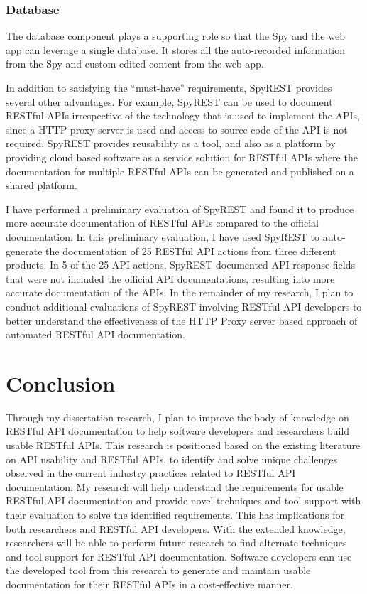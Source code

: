 \documentclass[11pt,oneside]{book}
\begin{document}
\subsection{Database}

The database component plays a supporting role so that the Spy and the web app can leverage a single database. It stores all the auto-recorded information from the Spy and custom edited content from the web app.

In addition to satisfying the “must-have” requirements, SpyREST provides several other advantages. For example, SpyREST can be used to document RESTful APIs irrespective of the technology that is used to implement the APIs, since a HTTP proxy server is used and access to source code of the API is not required. SpyREST provides reusability as a tool, and also as a platform by providing cloud based software as a service solution for RESTful APIs where the documentation for multiple RESTful APIs can be generated and published on a shared platform.

I have performed a preliminary evaluation of SpyREST and found it to produce more accurate documentation of RESTful APIs compared to the official documentation. In this preliminary evaluation, I have used SpyREST to auto-generate the documentation of 25 RESTful API actions from three different products. In 5 of the 25 API actions, SpyREST documented API response fields that were not included the official API documentations, resulting into more accurate documentation of the APIs. In the remainder of my research, I plan to conduct additional evaluations of SpyREST involving RESTful API developers to better understand the effectiveness of the HTTP Proxy server based approach of automated RESTful API documentation.

\chapter{Conclusion}

Through my dissertation research, I plan to improve the body of knowledge on RESTful API documentation to help software developers and researchers build usable RESTful APIs. This research is positioned based on the existing literature on API usability and RESTful APIs, to identify and solve unique challenges observed in the current industry practices related to RESTful API documentation. My research will help understand the requirements for usable RESTful API documentation and provide novel techniques and tool support with their evaluation to solve the identified requirements. This has implications for both researchers and RESTful API developers. With the extended knowledge, researchers will be able to perform future research to find alternate techniques and tool support for RESTful API documentation. Software developers can use the developed tool from this research to generate and maintain usable documentation for their RESTful APIs in a cost-effective manner.
\end{document}
